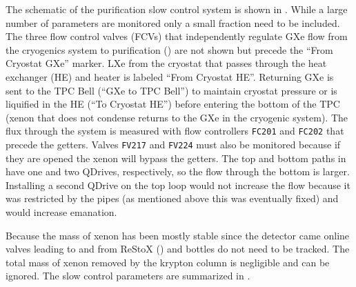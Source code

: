The schematic of the purification slow control system is shown in .  While a large
number of parameters are monitored only a small fraction need to be included.  The three flow control valves (FCVs) that independently
regulate GXe flow from the cryogenics system to purification () are not shown but precede the
``From Cryostat GXe'' marker.  LXe from the cryostat that passes
through the heat exchanger (HE) and heater is labeled ``From Cryostat HE''.  Returning GXe is sent to the TPC Bell (``GXe to TPC Bell'')
to maintain cryostat pressure or is liquified in the HE (``To Cryostat HE'') before entering the bottom of the TPC (xenon that does not
condense returns to the GXe in the cryogenic system).  The flux through the
system is
measured with flow controllers \texttt{FC201} and \texttt{FC202} that precede the getters.  Valves
\texttt{FV217} and \texttt{FV224} must also be monitored because if they are opened the xenon will bypass the getters.  The top and bottom
paths in  have one
and two QDrives, respectively, so the flow through the bottom is larger.  Installing a second QDrive on the top loop would not
increase the flow because it was restricted by the pipes (as mentioned above this was eventually fixed) and would increase 
emanation.

Because the mass of xenon has been mostly stable since the detector came online valves
leading to and from ReStoX () and bottles do not need to be tracked.  The total mass of xenon removed by the
krypton column is negligible and
can be ignored.  The slow control parameters are summarized in .

